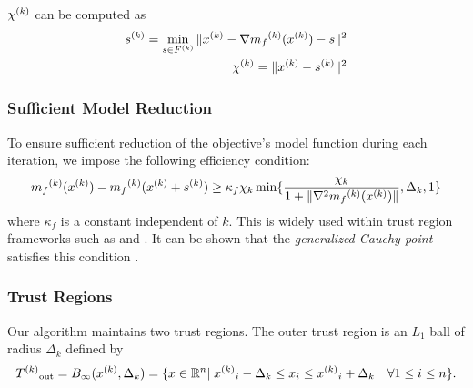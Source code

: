 
${\chi^{(k)}}$ can be computed as 
\begin{align}
\label{critical}
{s}^{(k)} = \min_{s \in {F}^{(k)}} \|{x}^{(k)} - \nabla {{m}_f}^{(k)}({x}^{(k)}) - s\|^2 \\
{\chi^{(k)}} = \|{x}^{(k)} - {s}^{(k)} \|^2 \\
\end{align}



\subsubsection{Sufficient Model Reduction}

To ensure sufficient reduction of the objective's model function during each iteration, we impose the following efficiency condition:
\begin{equation}
\label{efficiency}
{{m}_f}^{(k)}({x}^{(k)}) - {{m}_f}^{(k)}({x}^{(k)} + {s}^{(k)}) \ge \kappa_f \chi_k \min\{ \frac{\chi_k}{1+\|\nabla^2 {{m}_f}^{(k)}({x}^{(k)})\|}, \Delta_k, 1 \}
\end{equation}
where $\kappa_f$ is a constant independent of $k$.
This is widely used within trust region frameworks such as \cite{Conejo:2013:GCT:2620806.2621814} and \cite{Conn:2000:TM:357813}.
It can be shown that the \emph{generalized Cauchy point} satisfies this condition \cite{Conn:2000:TM:357813}.


\subsubsection{Trust Regions}
Our algorithm maintains two trust regions.
The outer trust region is an $L_1$ ball of radius $\Delta_k$ defined by
\begin{equation}
\label{trust_region}
{T^{(k)}}_{\text{out}} = B_{\infty}({x}^{(k)},\Delta_k) = \{x\in \mathbb R^n | \; {{x}^{(k)}}_i - \Delta_k \le x_i \le {{x}^{(k)}}_i + \Delta_k \quad \forall 1\le i \le n\}.
\end{equation}

